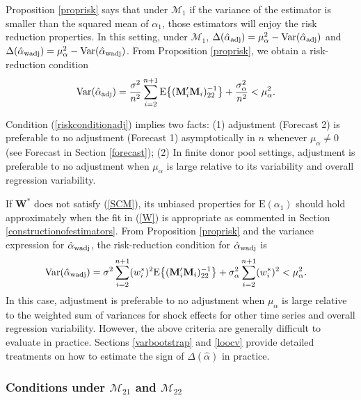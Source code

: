 \documentclass[11pt,3p,review,authoryear]{elsarticle}
\def\mbf#1{\mathbf{#1}} %
\def\mrm#1{\mathrm{#1}} %
\def\mc#1{\mathcal{#1}} %
\def\E#1{\mathrm{E}(#1)} %
\def\var#1{\mathrm{Var}(#1)} %
\theoremstyle{definition}
\begin{document}
Proposition \ref{proprisk} says that under $\mc{M}_1$ if the variance of the estimator is smaller than the squared mean of $\alpha_1$, those estimators will enjoy the risk reduction properties.   In this setting, under $\mc{M}_1$, $\Delta(\hat{\alpha}_{\rm adj})= \mu_{\alpha}^2-\var{\hat{\alpha}_{\rm adj}}$ and $\Delta(\hat{\alpha}_{\rm wadj})= \mu_{\alpha}^2-\var{\hat{\alpha}_{\rm wadj}}$. 
From Proposition \ref{proprisk}, we obtain a risk-reduction condition
\begin{align}
  \var{\hat{\alpha}_{\rm adj}} 
  &=\frac{\sigma^2}{n^2}\sum_{i=2}^{n+1}\mrm{E}\big\{(\mbf{M}'_i\mbf{M}_i)^{-1}_{22}\big\}+\frac{\sigma^2_{\alpha}}{n^2} < \mu_{\alpha}^2. \label{riskconditionadj}
\end{align}

Condition (\ref{riskconditionadj}) implies two facts: (1) adjustment (Forecast 2) is preferable to no adjustment (Forecast 1) asymptotically in $n$ whenever $\mu_{\alpha} \neq 0$ (see Forecast in Section \ref{forecast}); (2) In finite donor pool settings, adjustment is preferable to no adjustment when $\mu_{\alpha}$ is large relative to its variability and overall regression variability.   

If  $\mathbf{W}^*$ does not satisfy (\ref{SCM}), its unbiased properties for $\E{\alpha_1}$ should hold approximately when the fit in (\ref{W}) is appropriate as commented in Section \ref{constructionofestimators}. From Proposition \ref{proprisk} and the variance expression for $\hat{\alpha}_{\rm wadj}$, the risk-reduction condition for $\hat{\alpha}_{\rm wadj}$ is
\begin{align} \label{varwadj}
\var{\hat{\alpha}_{\rm wadj}}
 &= \sigma^2\sum_{i=2}^{n+1}(w_i^*)^2\mrm{E}\big\{(\mbf{M}'_i\mbf{M}_i)^{-1}_{22}\big\}+\sigma^2_{\alpha}\sum_{i=2}^{n+1}(w_i^*)^2 < \mu_{\alpha}^2.
\end{align}
In this case, adjustment is preferable to no adjustment when $\mu_{\alpha}$ is large relative to the weighted sum of variances for shock effects for other time series and overall regression variability.  However, the above criteria are generally difficult to evaluate in practice.  Sections \ref{varbootstrap} and \ref{loocv}  provide detailed treatments on how to estimate the sign of $\Delta(\hat\alpha)$ in practice.





\subsubsection{Conditions under $\mc{M}_{21}$ and $\mc{M}_{22}$}
\label{conditionsm2122}
\end{document}
